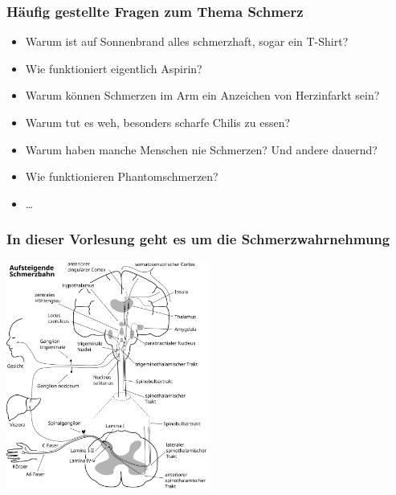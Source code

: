 \documentclass{beamer}
\begin{document}
\begin{frame}
\frametitle{Häufig gestellte Fragen zum Thema Schmerz}
\pause

\begin{itemize}
\item
Warum ist auf Sonnenbrand alles schmerzhaft, sogar ein T-Shirt?
\item
Wie funktioniert eigentlich Aspirin? 
\item
Warum können Schmerzen im Arm ein Anzeichen von Herzinfarkt sein? 
\item
Warum tut es weh, besonders scharfe Chilis zu essen?
\item
Warum haben manche Menschen nie Schmerzen? Und andere dauernd?
\item
Wie funktionieren Phantomschmerzen?  
\item
\dots 
\end{itemize}


\end{frame}





\begin{frame}
\frametitle{In dieser Vorlesung geht es um die Schmerzwahrnehmung}
\begin{center}
\includegraphics[width=0.5\textwidth]{Schmerz_aufsteigend.png}
\end{center}

\end{frame}





\end{document}
